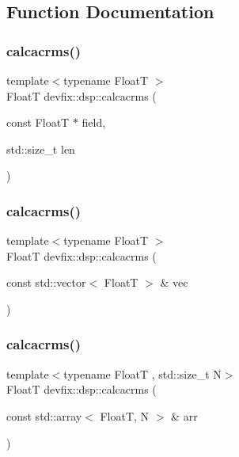 \subsection{Function Documentation}
\mbox{\label{namespacedevfix_1_1dsp_a844dcfe9edcac8ffc347b67f561dd46a}} 
\subsubsection{\texorpdfstring{calcacrms()}{calcacrms()}\hspace{0.1cm}{\footnotesize\ttfamily [1/3]}}
{\footnotesize\ttfamily template$<$typename FloatT $>$ \\
FloatT devfix\+::dsp\+::calcacrms (\begin{DoxyParamCaption}\item[{const FloatT $\ast$}]{field,  }\item[{std\+::size\+\_\+t}]{len }\end{DoxyParamCaption})}

\mbox{\label{namespacedevfix_1_1dsp_a1540e2d4c0a38da18dc948c84823ad73}} 
\subsubsection{\texorpdfstring{calcacrms()}{calcacrms()}\hspace{0.1cm}{\footnotesize\ttfamily [2/3]}}
{\footnotesize\ttfamily template$<$typename FloatT $>$ \\
FloatT devfix\+::dsp\+::calcacrms (\begin{DoxyParamCaption}\item[{const std\+::vector$<$ FloatT $>$ \&}]{vec }\end{DoxyParamCaption})}

\mbox{\label{namespacedevfix_1_1dsp_aedca7ae194c9a13164a2fdf91f37545a}} 
\subsubsection{\texorpdfstring{calcacrms()}{calcacrms()}\hspace{0.1cm}{\footnotesize\ttfamily [3/3]}}
{\footnotesize\ttfamily template$<$typename FloatT , std\+::size\+\_\+t N$>$ \\
FloatT devfix\+::dsp\+::calcacrms (\begin{DoxyParamCaption}\item[{const std\+::array$<$ FloatT, N $>$ \&}]{arr }\end{DoxyParamCaption})}

